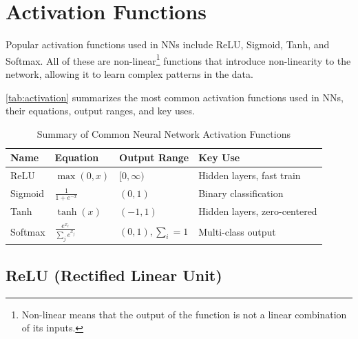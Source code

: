 \documentclass[oneside,11pt,dvipsnames]{book}
\numberwithin{equation}{section}
\theoremstyle{definition}
\theoremstyle{remark}
\newcommand{\sigmoid}[1]{\mathrm{sigmoid}\left(#1\right)}
\begin{document}
\section{Activation Functions}\label{sec:activation}
Popular activation functions used in NNs include ReLU, Sigmoid, Tanh, and Softmax. All of these are non-linear\footnote{Non-linear means that the output of the function is not a linear combination of its inputs.} functions that introduce non-linearity to the network, allowing it to learn complex patterns in the data.



\autoref{tab:activation} summarizes the most common activation functions used in NNs, their equations, output ranges, and key uses.

\begin{table}
  \centering
  \caption{Summary of Common Neural Network Activation Functions}\label{tab:activation}
  \small
  \begin{tabular}{llll}
    \toprule
    \textbf{Name} & \textbf{Equation} & \textbf{Output Range} & \textbf{Key Use} \\
    \midrule
    ReLU      & $ \max(0, x) $                   & $[0, \infty)$   & Hidden layers, fast train \\    
    Sigmoid   & $ \frac{1}{1 + e^{-x}} $         & $(0, 1)$        & Binary classification \\
    Tanh      & $ \tanh(x) $                     & $(-1, 1)$       & Hidden layers, zero-centered \\
    Softmax   & $ \frac{e^{x_i}}{\sum_j e^{x_j}} $& $(0, 1), \sum_i=1 $ & Multi-class output \\    
    \bottomrule
  \end{tabular}
\end{table}


\subsection{ReLU (Rectified Linear Unit)}\label{sec:relu}
\end{document}
